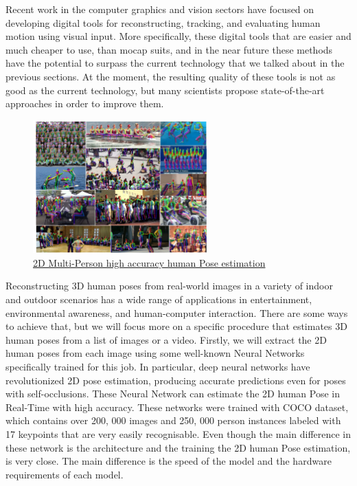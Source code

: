 Recent work in the computer graphics and vision sectors have focused on developing digital tools for reconstructing, tracking, and evaluating human motion using visual input. More specifically, these digital tools that are easier and much cheaper to use, than mocap suits, and in the near future these methods have the potential to surpass the current technology that we talked about in the previous sections. At the moment, the resulting quality of these tools is not as good as the current technology, but many scientists propose state-of-the-art approaches in order to improve them.\\  

 \begin{figure}[h]
	\centering
	\includegraphics[width=0.6\textwidth]{figures/background/2D.png}
	\caption{\href{https://openaccess.thecvf.com/content_cvpr_2017/papers/Cao_Realtime_Multi-Person_2D_CVPR_2017_paper.pdf}
	{2D Multi-Person high accuracy human Pose estimation}}
\end{figure}

Reconstructing 3D human poses from real-world images in a variety of indoor and outdoor scenarios has a wide range of applications in entertainment, environmental awareness, and human-computer interaction. There are some ways to achieve that, but we will focus more on a specific procedure that estimates 3D human poses from a list of images or a video. Firstly, we will extract the 2D human poses from each image using some well-known Neural Networks specifically trained for this job. In particular, deep neural networks \cite{OpenPose,HrNet,AlphaPose} have revolutionized  2D pose estimation, producing accurate predictions even for poses with self-occlusions. These Neural Network can estimate the 2D human Pose in Real-Time with  high accuracy. These networks were trained with COCO dataset,  which contains over 200, 000 images and 250, 000 person instances labeled with 17 keypoints that are very easily recognisable. Even though the main difference in these network is the architecture and the training the 2D human Pose estimation, is very close. The main difference is the speed of the model and the hardware requirements of each model.\\

